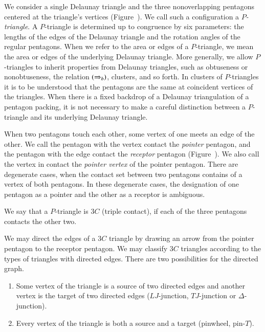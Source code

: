 We consider a single Delaunay triangle and the three nonoverlapping
pentagons centered at the triangle's vertices
(Figure~).  We call such a configuration a {\it
  $P$-triangle}.  A $P$-triangle is determined up to congruence by six
parameters: the lengths of the edges of the Delaunay triangle and the
rotation angles of the regular pentagons.  When we refer to the area
or edges of a $P$-triangle, we mean the area or edges of the
underlying Delaunay triangle.  More generally, we allow $P$-triangles
to inherit properties from Delaunay triangles, such as obtuseness or
nonobtuseness, the relation $(\Rightarrow_{b})$, clusters, and so forth. In
clusters of $P$-triangles it is to be understood that the pentagons
are the same at coincident vertices of the triangles.  When there is a
fixed backdrop of a Delaunay triangulation of a pentagon packing, it
is not necessary to make a careful distinction between a $P$-triangle
and its underlying Delaunay triangle.


When two pentagons touch each other, some vertex of one meets an edge
of the other.  We call the pentagon with the vertex contact the {\it
  pointer} pentagon, and the pentagon with the edge contact the {\it
  receptor} pentagon (Figure~).  We also call the
vertex in contact the {\it pointer vertex} of the pointer
pentagon. There are degenerate cases, when the contact set between two
pentagons contains of a vertex of both pentagons.  In these degenerate
cases, the designation of one pentagon as a pointer and the other as a
receptor is ambiguous.




We say that a $P$-triangle is $3C$ (triple contact),
if each of the three pentagons contacts the other two.

We may direct the edges of a $3C$ triangle by drawing an arrow from
the pointer pentagon to the receptor pentagon.  We may classify $3C$
triangles according to the types of triangles with directed edges.
There are two possibilities for the directed graph.
\begin{enumerate}
\item Some vertex of the triangle is a source of two directed edges
  and another vertex is the target of two directed edges
  ($LJ$-junction, $TJ$-junction or $\Delta$-junction).
\item Every vertex of the triangle is both a source and a target
  (pinwheel, pin-$T$).
\end{enumerate}

